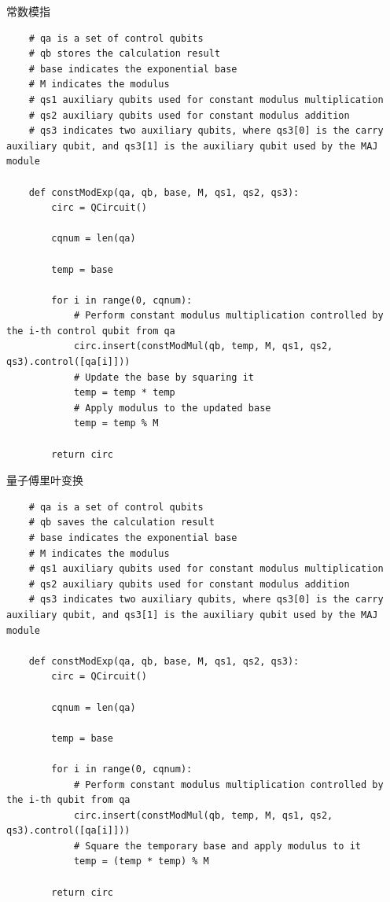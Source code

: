\documentclass[12pt,hyperref,a4paper,UTF8]{ctexart}
\begin{document}
常数模指
\begin{lstlisting}
    # qa is a set of control qubits
    # qb stores the calculation result
    # base indicates the exponential base
    # M indicates the modulus
    # qs1 auxiliary qubits used for constant modulus multiplication
    # qs2 auxiliary qubits used for constant modulus addition
    # qs3 indicates two auxiliary qubits, where qs3[0] is the carry auxiliary qubit, and qs3[1] is the auxiliary qubit used by the MAJ module

    def constModExp(qa, qb, base, M, qs1, qs2, qs3):
        circ = QCircuit()

        cqnum = len(qa)

        temp = base

        for i in range(0, cqnum):
            # Perform constant modulus multiplication controlled by the i-th control qubit from qa
            circ.insert(constModMul(qb, temp, M, qs1, qs2, qs3).control([qa[i]]))
            # Update the base by squaring it
            temp = temp * temp
            # Apply modulus to the updated base
            temp = temp % M

        return circ
\end{lstlisting}

量子傅里叶变换
\begin{lstlisting}
    # qa is a set of control qubits
    # qb saves the calculation result
    # base indicates the exponential base
    # M indicates the modulus
    # qs1 auxiliary qubits used for constant modulus multiplication
    # qs2 auxiliary qubits used for constant modulus addition
    # qs3 indicates two auxiliary qubits, where qs3[0] is the carry auxiliary qubit, and qs3[1] is the auxiliary qubit used by the MAJ module

    def constModExp(qa, qb, base, M, qs1, qs2, qs3):
        circ = QCircuit()

        cqnum = len(qa)

        temp = base

        for i in range(0, cqnum):
            # Perform constant modulus multiplication controlled by the i-th qubit from qa
            circ.insert(constModMul(qb, temp, M, qs1, qs2, qs3).control([qa[i]]))
            # Square the temporary base and apply modulus to it
            temp = (temp * temp) % M

        return circ
\end{lstlisting}
\end{document}
